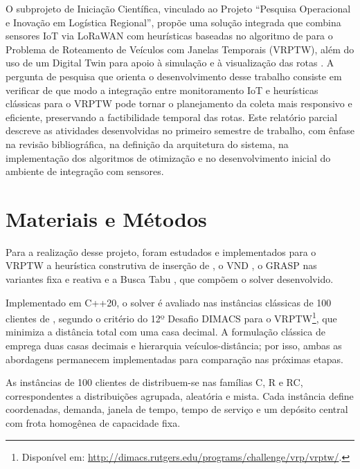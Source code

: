\documentclass[12pt, a4paper]{article}
\begin{document}
O subprojeto de Iniciação Científica, vinculado ao Projeto ``Pesquisa Operacional e Inovação em Logística Regional'', propõe uma solução integrada que combina sensores IoT via LoRaWAN \citep{ramson2021lorawan, de2021plataforma} com heurísticas baseadas no algoritmo de \citet{solomon1987algorithms} para o Problema de Roteamento de Veículos com Janelas Temporais (VRPTW), além do uso de um Digital Twin para apoio à simulação e à visualização das rotas \citep{barth2023data}. A pergunta de pesquisa que orienta o desenvolvimento desse trabalho consiste em verificar de que modo a integração entre monitoramento IoT e heurísticas clássicas para o VRPTW pode tornar o planejamento da coleta mais responsivo e eficiente, preservando a factibilidade temporal das rotas. Este relatório parcial descreve as atividades desenvolvidas no primeiro semestre de trabalho, com ênfase na revisão bibliográfica, na definição da arquitetura do sistema, na implementação dos algoritmos de otimização e no desenvolvimento inicial do ambiente de integração com sensores.


\section{Materiais e Métodos}
\label{sec-metodo}

Para a realização desse projeto, foram estudados e implementados para o VRPTW a heurística construtiva de inserção de \citet{solomon1987algorithms}, o VND \citep{hansen2001variable}, o GRASP nas variantes fixa e reativa \citep{feo1995greedy, resende2003greedy, prais2000reactive} e a Busca Tabu \citep{glover1989tabu, glover1990tabu}, que compõem o solver desenvolvido.

Implementado em C++20, o solver é avaliado nas instâncias clássicas de 100 clientes de \citet{solomon1987algorithms}, segundo o critério do 12º Desafio DIMACS para o VRPTW\footnote{Disponível em: \url{http://dimacs.rutgers.edu/programs/challenge/vrp/vrptw/}.}, que minimiza a distância total com uma casa decimal. A formulação clássica de \citet{solomon1987algorithms} emprega duas casas decimais e hierarquia veículos-distância; por isso, ambas as abordagens permanecem implementadas para comparação nas próximas etapas.

As instâncias de 100 clientes de \citet{solomon1987algorithms} distribuem-se nas famílias C, R e RC, correspondentes a distribuições agrupada, aleatória e mista. Cada instância define coordenadas, demanda, janela de tempo, tempo de serviço e um depósito central com frota homogênea de capacidade fixa.
\end{document}
